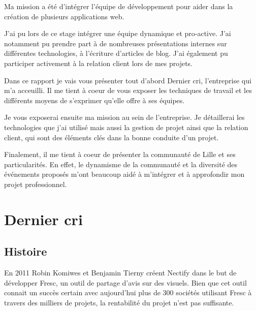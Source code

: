\documentclass[12pt,a4paper]{article}
\begin{document}
  \bigskip

  Ma mission a été d'intégrer l'équipe de développement pour aider dans la
  création de plusieurs applications web.

  \bigskip

  J'ai pu lors de ce stage intégrer une équipe dynamique et pro-active.
  J'ai notamment pu prendre part à de nombreuses présentations internes
  sur différentes technologies, à l'écriture d'articles de blog. J'ai
  également pu participer activement à la relation client lors de mes
  projets.

  \bigskip

  Dans ce rapport je vais vous présenter tout d'abord Dernier cri,
  l'entreprise qui m'a acceuilli. Il me tient à coeur de vous exposer les
  techniques de travail et les différents moyens de s'exprimer qu'elle
  offre à ses équipes.

  \bigskip

  Je vous exposerai ensuite ma mission au sein de l'entreprise. Je
  détaillerai les technologies que j'ai utilisé mais aussi la gestion de
  projet ainsi que la relation client, qui sont des éléments clés dans la
  bonne conduite d'un projet.

  \bigskip

  Finalement, il me tient à coeur de présenter la communauté de Lille et
  ses particularités. En effet, le dynamisme de la communauté et la
  diversité des événements proposés m'ont beaucoup aidé à m'intégrer et à
  approfondir mon projet professionnel.

  \newpage

  \section{Dernier cri}\label{dernier-cri}

  \bigskip

  \subsection{Histoire}\label{histoire}

  \bigskip

  En 2011 Robin Komiwes et Benjamin Tierny créent Nectify dans le but de
  développer Fresc, un outil de partage d'avis sur des visuels. Bien que
  cet outil connait un succès certain avec aujourd'hui plus de 300
  sociétés utilisant Fresc à travers des milliers de projets, la
  rentabilité du projet n'est pas suffisante.
\end{document}
